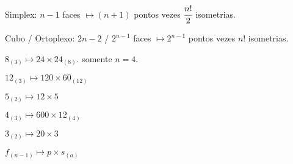\documentclass[12pt]{article}
\begin{document}
Simplex: $n-1$ faces $\mapsto (n + 1)$ pontos vezes $\cfrac{n!}{2}$ isometrias.

Cubo / Ortoplexo: $2n-2$ / $2^{n-1}$ faces $\mapsto 2^{n - 1}$ pontos vezes $n!$ isometrias.

$8_{(3)} \mapsto 24 \times 24_{(8)}$. somente $n = 4$.

$12_{(3)} \mapsto 120 \times 60_{(12)}$

$5_{(2)} \mapsto 12 \times 5$

$4_{(3)} \mapsto 600 \times 12_{(4)}$

$3_{(2)} \mapsto 20 \times 3$

$f_{(n-1)} \mapsto p \times s_{(a)}$
\end{document}
